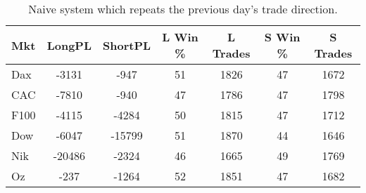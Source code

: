 \begin{table}[ht]
\centering
\caption[Naive Following System.]{Naive system which repeats the previous day's trade direction.} 
\label{tab:ntfresults}
\begin{tabular}{lcccccc}
  \toprule Mkt & LongPL & ShortPL & L Win \% & L Trades & S Win \% & S Trades \\ 
  \midrule Dax & -3131 & -947 & 51 & 1826 & 47 & 1672 \\ 
  CAC & -7810 & -940 & 47 & 1786 & 47 & 1798 \\ 
  F100 & -4115 & -4284 & 50 & 1815 & 47 & 1712 \\ 
  Dow & -6047 & -15799 & 51 & 1870 & 44 & 1646 \\ 
  Nik & -20486 & -2324 & 46 & 1665 & 49 & 1769 \\ 
  Oz & -237 & -1264 & 52 & 1851 & 47 & 1682 \\ 
   \bottomrule \end{tabular}
\end{table}
